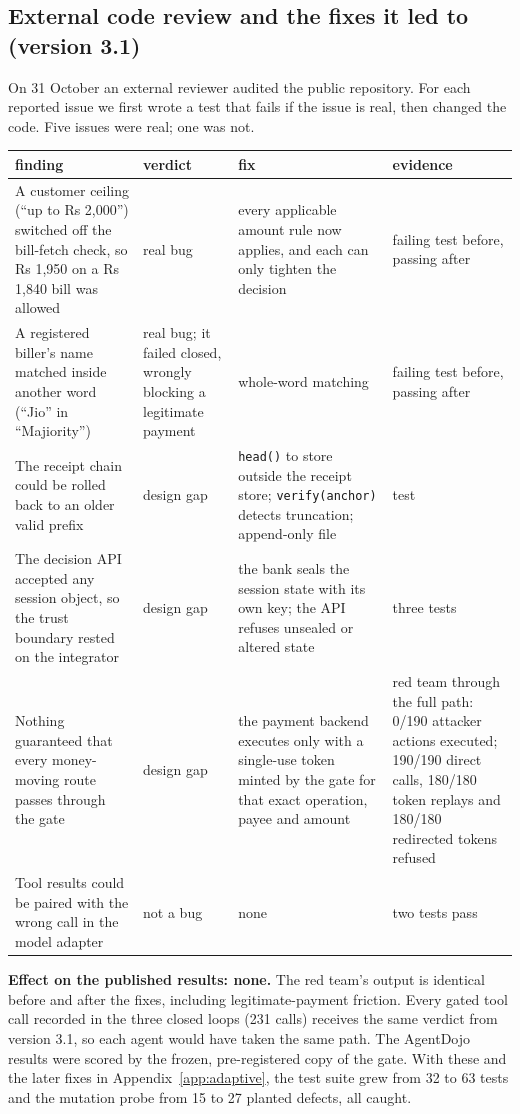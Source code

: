 \documentclass[10pt,a4paper]{article}
\begin{document}
\subsection{External code review and the fixes it led to (version 3.1)}\label{app:review}
On 31 October an external reviewer audited the public repository. For each reported issue we first wrote a test that fails
if the issue is real, then changed the code. Five issues were real; one was not.
{\small
\begin{longtable}{p{4.4cm}p{2.4cm}p{\dimexpr\linewidth-10.1cm-8\tabcolsep\relax}p{3.3cm}}
\toprule
finding & verdict & fix & evidence\\
\midrule
A customer ceiling (``up to Rs 2,000'') switched off the bill-fetch check, so Rs 1,950 on a Rs 1,840 bill was allowed &
real bug & every applicable amount rule now applies, and each can only tighten the decision & failing test before, passing
after\\
A registered biller's name matched inside another word (``Jio'' in ``Majiority'') & real bug; it failed closed, wrongly
blocking a legitimate payment & whole-word matching & failing test before, passing after\\
The receipt chain could be rolled back to an older valid prefix & design gap & \texttt{head()} to store outside the
receipt store; \texttt{verify(anchor)} detects truncation; append-only file & test\\
The decision API accepted any session object, so the trust boundary rested on the integrator & design gap & the bank
seals the session state with its own key; the API refuses unsealed or altered state & three tests\\
Nothing guaranteed that every money-moving route passes through the gate & design gap & the payment backend executes only
with a single-use token minted by the gate for that exact operation, payee and amount & red team through the full path:
0/190 attacker actions executed; 190/190 direct calls, 180/180 token replays and 180/180 redirected tokens refused\\
Tool results could be paired with the wrong call in the model adapter & not a bug & none & two tests pass\\
\bottomrule
\end{longtable}}
\textbf{Effect on the published results: none.} The red team's output is identical before and after the fixes, including
legitimate-payment friction. Every gated tool call recorded in the three closed loops (231 calls) receives the same verdict
from version 3.1, so each agent would have taken the same path. The AgentDojo results were scored by the frozen,
pre-registered copy of the gate. With these and the later fixes in Appendix~\ref{app:adaptive}, the test suite grew from
32 to 63 tests and the mutation probe from 15 to 27 planted defects, all caught.
\end{document}
